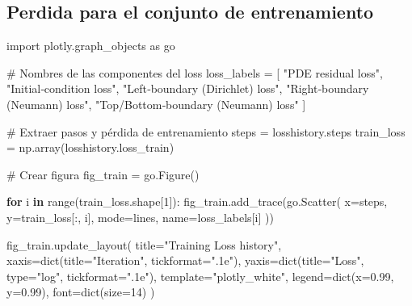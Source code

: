 \documentclass[
  spanish,
  us-letterpaper,
  DIV=11,
  numbers=noendperiod]{scrreprt}
\newenvironment{Shaded}{\begin{snugshade}}{\end{snugshade}}
\newcommand{\BuiltInTok}[1]{\textcolor[rgb]{0.00,0.23,0.31}{#1}}
\newcommand{\CommentTok}[1]{\textcolor[rgb]{0.37,0.37,0.37}{#1}}
\newcommand{\ControlFlowTok}[1]{\textcolor[rgb]{0.00,0.23,0.31}{\textbf{#1}}}
\newcommand{\DecValTok}[1]{\textcolor[rgb]{0.68,0.00,0.00}{#1}}
\newcommand{\FloatTok}[1]{\textcolor[rgb]{0.68,0.00,0.00}{#1}}
\newcommand{\ImportTok}[1]{\textcolor[rgb]{0.00,0.46,0.62}{#1}}
\newcommand{\KeywordTok}[1]{\textcolor[rgb]{0.00,0.23,0.31}{\textbf{#1}}}
\newcommand{\NormalTok}[1]{\textcolor[rgb]{0.00,0.23,0.31}{#1}}
\newcommand{\OperatorTok}[1]{\textcolor[rgb]{0.37,0.37,0.37}{#1}}
\newcommand{\StringTok}[1]{\textcolor[rgb]{0.13,0.47,0.30}{#1}}
\theoremstyle{plain}
\theoremstyle{definition}
\theoremstyle{remark}
\begin{document}
\subsection{Perdida para el conjunto de
entrenamiento}\label{perdida-para-el-conjunto-de-entrenamiento}

\begin{Shaded}
\begin{Highlighting}[]
\ImportTok{import}\NormalTok{ plotly.graph\_objects }\ImportTok{as}\NormalTok{ go}

\CommentTok{\# Nombres de las componentes del loss}
\NormalTok{loss\_labels }\OperatorTok{=}\NormalTok{ [}
    \StringTok{"PDE residual loss"}\NormalTok{,}
    \StringTok{"Initial‐condition loss"}\NormalTok{,}
    \StringTok{"Left‐boundary (Dirichlet) loss"}\NormalTok{,}
    \StringTok{"Right‐boundary (Neumann) loss"}\NormalTok{,}
    \StringTok{"Top/Bottom‐boundary (Neumann) loss"}
\NormalTok{]}

\CommentTok{\# Extraer pasos y pérdida de entrenamiento}
\NormalTok{steps }\OperatorTok{=}\NormalTok{ losshistory.steps}
\NormalTok{train\_loss }\OperatorTok{=}\NormalTok{ np.array(losshistory.loss\_train)}

\CommentTok{\# Crear figura}
\NormalTok{fig\_train }\OperatorTok{=}\NormalTok{ go.Figure()}

\ControlFlowTok{for}\NormalTok{ i }\KeywordTok{in} \BuiltInTok{range}\NormalTok{(train\_loss.shape[}\DecValTok{1}\NormalTok{]):}
\NormalTok{    fig\_train.add\_trace(go.Scatter(}
\NormalTok{        x}\OperatorTok{=}\NormalTok{steps,}
\NormalTok{        y}\OperatorTok{=}\NormalTok{train\_loss[:, i],}
\NormalTok{        mode}\OperatorTok{=}\StringTok{\textquotesingle{}lines\textquotesingle{}}\NormalTok{,}
\NormalTok{        name}\OperatorTok{=}\NormalTok{loss\_labels[i]}
\NormalTok{    ))}

\NormalTok{fig\_train.update\_layout(}
\NormalTok{    title}\OperatorTok{=}\StringTok{"Training Loss history"}\NormalTok{,}
\NormalTok{    xaxis}\OperatorTok{=}\BuiltInTok{dict}\NormalTok{(title}\OperatorTok{=}\StringTok{"Iteration"}\NormalTok{, tickformat}\OperatorTok{=}\StringTok{".1e"}\NormalTok{),}
\NormalTok{    yaxis}\OperatorTok{=}\BuiltInTok{dict}\NormalTok{(title}\OperatorTok{=}\StringTok{"Loss"}\NormalTok{, }\BuiltInTok{type}\OperatorTok{=}\StringTok{"log"}\NormalTok{, tickformat}\OperatorTok{=}\StringTok{".1e"}\NormalTok{),}
\NormalTok{    template}\OperatorTok{=}\StringTok{"plotly\_white"}\NormalTok{,}
\NormalTok{    legend}\OperatorTok{=}\BuiltInTok{dict}\NormalTok{(x}\OperatorTok{=}\FloatTok{0.99}\NormalTok{, y}\OperatorTok{=}\FloatTok{0.99}\NormalTok{),}
\NormalTok{    font}\OperatorTok{=}\BuiltInTok{dict}\NormalTok{(size}\OperatorTok{=}\DecValTok{14}\NormalTok{)}
\NormalTok{)}
\end{Highlighting}
\end{Shaded}
\end{document}
